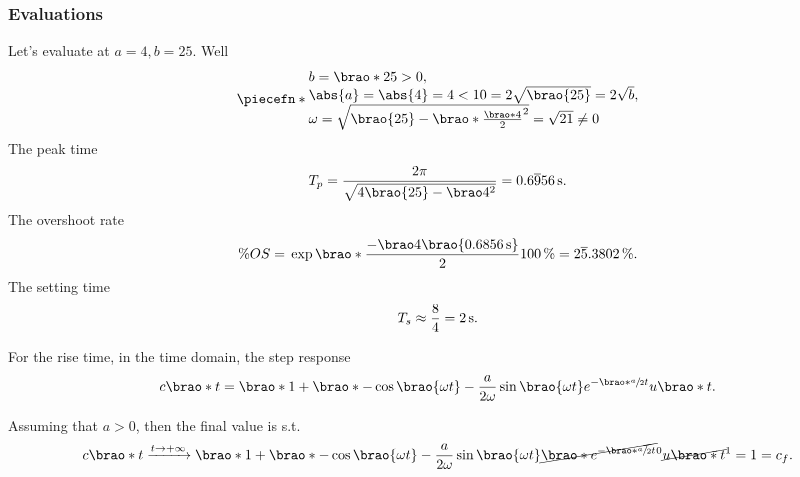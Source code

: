 \documentclass[12pt]{article}
\newcommand*\siexpr[2][]{\SI[parse-numbers=false,#1]{#2}}%
\DeclarePairedDelimiter\brao()%
\DeclarePairedDelimiter\abs||
\DeclarePairedDelimiter\piecefn\{.
\begin{document}
\begin{enumerate}
        \subsubsection{Evaluations}
        Let's evaluate at $a = 4, b = 25$. Well
        \begin{equation}
            \piecefn*{
                \begin{array}{@{}l@{}}
                    b = \brao*{25} > 0,
                \\*
                    \abs{a} = \abs{4} = 4 < 10 = 2\sqrt{\brao{25}} = 2\sqrt{b},
                \\*
                    \omega = \sqrt{\brao{25} - \brao*{\frac{\brao*4}2}^2} = \sqrt{21} \not= 0
                \\*
                \end{array}
            }
        \end{equation}
        The peak time
        \begin{equation}
            T_p = \frac{2\pi}{\sqrt{4\brao{25} - \brao4^2}} = \siexpr{0.6\overline956}\second.
        \end{equation}
        The overshoot rate
        \begin{equation}
                \% OS
                ={} \exp\brao*{\frac{-\brao4\brao{\SI{0.6856}\second}}2} \SI{100}\percent = \siexpr{2\overline5.3802}\percent.
        \end{equation}
        The setting time
        \begin{equation}
            T_s \approx \frac84 = \SI2\second.
        \end{equation}

        For the rise time, in the time domain, the step response
        \begin{equation}
            \begin{aligned}
                c\brao*t = \brao*{1 + \brao*{-\cos\brao{\omega t} - \frac{a}{2\omega} \sin\brao{\omega t} }{e^{-\brao*{\sfrac{a}2}t}}}u\brao*t.
            \end{aligned}
        \end{equation}

        Assuming that $a > 0$, then the final value is s.t.
        \begin{equation}
            c\brao*t
            \xrightarrow{t\to+\infty} \brao*{1 + \brao*{-\cos\brao{\omega t} - \frac{a}{2\omega} \sin\brao{\omega t} }\cancel{\brao*{e^{-\brao*{\sfrac{a}2}t}}}^0} \cancel{u\brao*t}^1 = 1 = c_f.
        \end{equation}


\end{enumerate}
\end{document}
